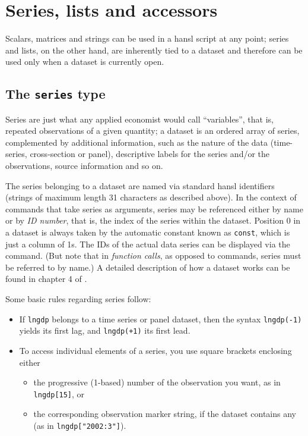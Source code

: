 \chapter{Series, lists and accessors}

Scalars, matrices and strings can be used in a hansl script at any
point; series and lists, on the other hand, are inherently tied to a
dataset and therefore can be used only when a dataset is currently
open.

\section{The \texttt{series} type}
\label{sec:series}
 
Series are just what any applied economist would call ``variables'',
that is, repeated observations of a given quantity; a dataset is an
ordered array of series, complemented by additional information,
such as the nature of the data (time-series, cross-section or panel),
descriptive labels for the series and/or the observations, source
information and so on.

The series belonging to a dataset are named via standard hansl
identifiers (strings of maximum length 31 characters as described
above). In the context of commands that take series as arguments,
series may be referenced either by name or by \emph{ID number}, that
is, the index of the series within the dataset. Position 0 in a
dataset is always taken by the automatic constant known as
\texttt{const}, which is just a column of 1s. The IDs of the actual
data series can be displayed via the  command. (But note
that in \textit{function calls}, as opposed to commands, series must
be referred to by name.)  A detailed description of how a dataset
works can be found in chapter 4 of \GUG.

Some basic rules regarding series follow:
\begin{itemize}
\item If \texttt{lngdp} belongs to a time series or panel dataset,
  then the syntax \texttt{lngdp(-1)} yields its first lag, and
  \texttt{lngdp(+1)} its first lead.
\item To access individual elements of a series, you use square
  brackets enclosing either
  \begin{itemize}
  \item the progressive (1-based) number of the observation you want,
    as in \verb|lngdp[15]|, or
  \item the corresponding observation marker string, if the dataset
    contains any (as in \verb|lngdp["2002:3"]|).
  \end{itemize}
\end{itemize}

